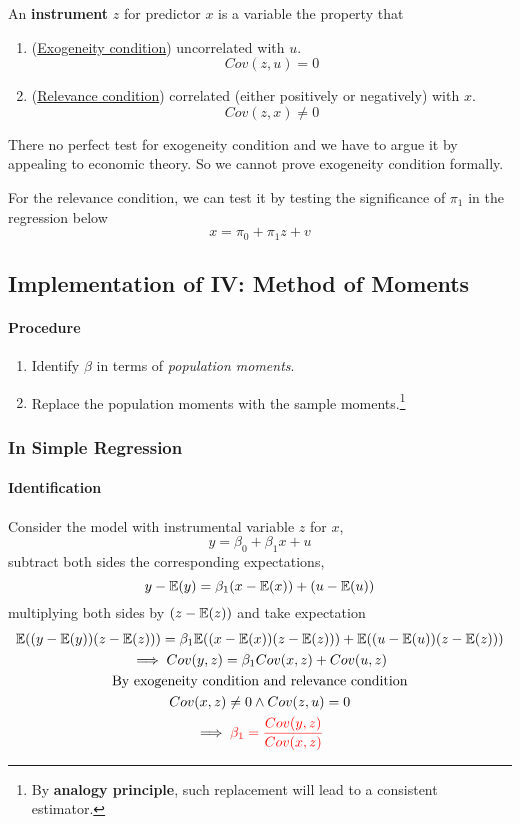 \documentclass[]{article}
\begin{document}
			\begin{definition}
				An \textbf{instrument} $z$ for predictor $x$ is a variable the property that
				\begin{enumerate}
					\item (\ul{Exogeneity condition}) uncorrelated with $u$. \[ Cov(z,u) = 0\]
					\item (\ul{Relevance condition}) correlated (either positively or negatively) with $x$. \[Cov(z,x) \neq 0\]
				\end{enumerate}
			\end{definition}
			
			\begin{remark}
				There no perfect test for exogeneity condition and we have to argue it by appealing to economic theory. So we cannot prove exogeneity condition formally.
			\end{remark}
			\begin{remark}
				For the relevance condition, we can test it by testing the significance of $\pi_1$ in the regression below
					\[
						x = \pi_0 + \pi_1 z + v
					\]
			\end{remark}
		\subsection{Implementation of IV: Method of Moments}
			\paragraph{Procedure}
				\begin{enumerate}
					\item Identify $\beta$ in terms of \emph{population moments}.
					\item Replace the population moments with the sample moments.\footnote{By \textbf{analogy principle}, such replacement will lead to a consistent estimator.}
				\end{enumerate}
			\subsubsection{In Simple Regression}
				\paragraph{Identification} Consider the model with instrumental variable $z$ for $x$,
					\[
						y = \beta_0 + \beta_1 x + u
					\]
					subtract both sides the corresponding expectations,
					\[
						y - \mathbb{E}({y}) = \beta_1 (x - \mathbb{E}({x})) + (u - \mathbb{E}({u}))
					\]
					multiplying both sides by $(z - \mathbb{E}({z}))$ and take expectation
					\begin{gather*}
						\mathbb{E}({(y-\mathbb{E}({y}))(z-\mathbb{E}({z}))}) = \beta_1\mathbb{E}({(x-\mathbb{E}({x}))(z-\mathbb{E}({z}))}) + \mathbb{E}({(u-\mathbb{E}({u}))(z-\mathbb{E}({z}))}) \\
						\implies Cov(y, z) = \beta_1 Cov(x,z) + Cov(u,z) \\
						\text{{By exogeneity condition and relevance condition}} \\
						Cov(x,z) \neq 0 \land Cov(z,u) = 0\\
						\implies \textcolor{red}{\beta_1 = \frac{Cov(y,z)}{Cov(x,z)}}
					\end{gather*}
\end{document}
